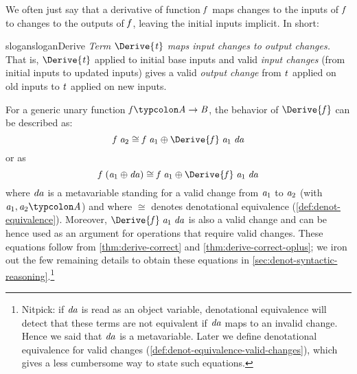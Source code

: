 We often just say that a derivative
of function \ensuremath{\Varid{f}} maps changes to the inputs of \ensuremath{\Varid{f}} to changes to the outputs of
\ensuremath{\Varid{f}}, leaving the initial inputs implicit. In short:
\begin{restatable}{slogan}{sloganDerive}
  \label{slogan:derive}
  \emph{Term \ensuremath{\Derive{\Varid{t}}} maps input changes to output changes.}
  That is, \ensuremath{\Derive{\Varid{t}}} applied to initial base inputs and valid \emph{input changes}
  (from initial inputs to updated inputs) gives a valid \emph{output change} from \ensuremath{\Varid{t}}
  applied on old inputs to \ensuremath{\Varid{t}} applied on new inputs.
\end{restatable}

For a
generic unary function \ensuremath{\Varid{f}\typcolon\Conid{A}\to \Conid{B}}, the behavior of \ensuremath{\Derive{\Varid{f}}} can be described as:
\begin{equation}
  \label{eq:correctness}
  \ensuremath{\Varid{f}\;\Varid{a}_{2}\cong\Varid{f}\;\Varid{a}_{1}\oplus \Derive{\Varid{f}}\;\Varid{a}_{1}\;\Varid{da}}
\end{equation}
or as
\begin{equation}
  \label{eq:correctness-alt}
  \ensuremath{\Varid{f}\;(\Varid{a}_{1}\oplus \Varid{da})\cong\Varid{f}\;\Varid{a}_{1}\oplus \Derive{\Varid{f}}\;\Varid{a}_{1}\;\Varid{da}}
\end{equation}
where \ensuremath{\Varid{da}} is a metavariable standing for a valid change from \ensuremath{\Varid{a}_{1}} to \ensuremath{\Varid{a}_{2}} (with \ensuremath{\Varid{a}_{1},\Varid{a}_{2}\typcolon\Conid{A}}) and
where \ensuremath{\cong} denotes denotational equivalence (\cref{def:denot-equivalence}).
Moreover, \ensuremath{\Derive{\Varid{f}}\;\Varid{a}_{1}\;\Varid{da}} is also a valid change and can be hence used as an
argument for operations that require valid changes.
These equations follow from \cref{thm:derive-correct} and
\cref{thm:derive-correct-oplus}; we iron out the few remaining details to obtain
these equations in \cref{sec:denot-syntactic-reasoning}.\footnote{Nitpick: if
  \ensuremath{\Varid{da}} is read as an object variable, denotational equivalence will detect that
  these terms are not equivalent if \ensuremath{\Varid{da}} maps to an invalid change. Hence we
  said that \ensuremath{\Varid{da}} is a metavariable. Later we define denotational equivalence for valid changes
  (\cref{def:denot-equivalence-valid-changes}), which gives a less cumbersome way
  to state such equations.}%

